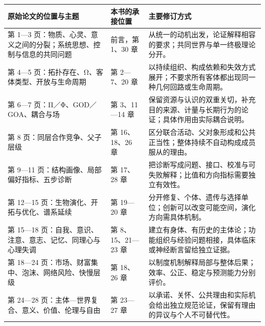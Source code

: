 \documentclass[
  11pt,
  oneside]{book}
\newcounter{none} %
\begin{document}
{\def\LTcaptype{none} %
\begin{longtable}[]{@{}
  >{\raggedright\arraybackslash}p{}
  >{\raggedright\arraybackslash}p{}
  >{\raggedright\arraybackslash}p{}@{}}
\toprule\noalign{}
\begin{minipage}[b]{\linewidth}\raggedright
原始论文的位置与主题
\end{minipage} & \begin{minipage}[b]{\linewidth}\raggedright
本书的承接位置
\end{minipage} & \begin{minipage}[b]{\linewidth}\raggedright
主要修订方式
\end{minipage} \\
\midrule\noalign{}
\endhead
\bottomrule\noalign{}
\endlastfoot
第 1---3 页：物质、心灵、意义之间的分裂；系统思想、控制与信息的共同问题 & 前言，第 1、30 章 & 从统一的动机出发，论证解释相容的要求；共同世界与单一终极理论分开。 \\
第 4---5 页：拓扑存在、Ω、客体类型、开放与生命周期 & 第 2---7、20 章 & 以持续组织、构成依赖和失效方式展开；不要求所有客体都出现同一种几何回路或生命周期。 \\
第 6---7 页：Π／Φ、GOD／GOA、耦合与场 & 第 3、11---14 章 & 保留资源与认识的双重关切，补充目的来源、计量与长期行为的论证；具体作用由实际耦合说明。 \\
第 8 页：同层合作竞争、父子层级 & 第 16、18、26 章 & 区分联合活动、父对象形成和公共正当性；整体持续不自动构成成员服从的理由。 \\
第 9---11 页：结构画像、局部偏好指标、五步诊断 & 第 17、28 章 & 把诊断写成问题、接口、校准与可失败解释；比值和方向指标需要独立有效性。 \\
第 12---15 页：生物演化、开拓与优化、谱系延续 & 第 19---20 章 & 分开修复、个体、遗传与选择单位；创新可以改变可能空间，演化方向需具体机制。 \\
第 15---18 页：自我、意识、注意、意志、记忆、同理心与心理失调 & 第 8、15、21---23 章 & 建立有身体、有历史的主体论；功能组织与经验问题相接，具体临床或神经断言留给独立证据。 \\
第 18---24 页：市场、财富集中、泡沫、网络风险、快慢层级 & 第 18、26 章 & 以制度机制解释局部与整体后果；效率、公正、稳定与预测能力分别评价。 \\
第 24---28 页：主体---世界复合、意义、价值、伦理与自由 & 第 23---27 章 & 以承诺、关怀、公共理由和实际机会给出独立规范论证，保留有理由的异议与个人不可替代性。 \\

\end{longtable}}
\end{document}
